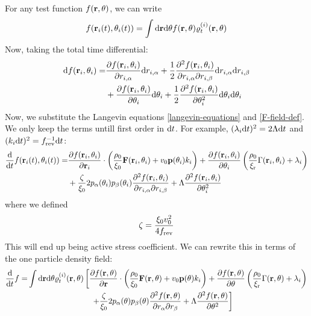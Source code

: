 \documentclass[a5paper]{article}
\begin{document}
For any test function $f(\mathbf{r}, \theta)$, we can write
\begin{align}
    f(\mathbf{r}_i(t), \theta_i(t)) = \int \mathrm{d}\mathbf{r} \mathrm{d}\theta f(\mathbf{r}, \theta) \varrho^{(i)}_t(\mathbf{r}, \theta)
\end{align}
Now, taking the total time differential:
\begin{align}
    \mathrm{d} f(\mathbf{r}_i, \theta_i) 
    =& \frac{\partial f(\mathbf{r}_i, \theta_i)}{\partial r_{i,\alpha}} \mathrm{d} r_{i,\alpha}
    + \frac{1}{2} \frac{\partial^2 f(\mathbf{r}_i, \theta_i)}{\partial r_{i,\alpha}\partial r_{i,\beta}}
    \mathrm{d} r_{i,\alpha}\mathrm{d} r_{i,\beta}
    \\
    &+ \frac{\partial f(\mathbf{r}_i, \theta_i)}{\partial \theta_i} \mathrm{d}\theta_i
    + \frac{1}{2} \frac{\partial^2 f(\mathbf{r}_i, \theta_i)}{\partial \theta_i^2} \mathrm{d}\theta_i\mathrm{d}\theta_i
\end{align}
Now, we substitute the Langevin equations \eqref{langevin-equations} and \cref{F-field-def}. We only keep the terms untill first order in $\mathrm{d} t$. For example, $ (\lambda_i \mathrm{d} t)^2 = 2\Lambda \mathrm{d} t$ and $ (k_i\mathrm{d} t)^2 = f_{\rm rev}^{-1} \mathrm{d} t$:
\begin{align}
    \label{total-time-derivative-f}
    \frac{\mathrm{d}}{\mathrm{d} t} f(\mathbf{r}_i(t), \theta_i(t)) 
    =& \frac{\partial f(\mathbf{r}_i, \theta_i)}{\partial \mathbf{r}_i} \cdot\left( \frac{\rho_0}{\xi_0}\mathbf{F}(\mathbf{r}_i, \theta_i) + v_0 \mathbf{p}(\theta_i) k_i \right) + \frac{\partial f(\mathbf{r}_i, \theta_i)}{\partial \theta_i} \left( \frac{\rho_0}{\xi_{\rm r}}\Gamma(\mathbf{r}_i, \theta_i) + \lambda_i \right) 
    \\
    &+ \frac{\zeta}{\xi_0} 2 p_\alpha(\theta_i) p_\beta(\theta_i) \frac{\partial^2 f(\mathbf{r}_i, \theta_i)}{\partial r_{i,\alpha}\partial r_{i,\beta}} 
    + \Lambda \frac{\partial^2 f(\mathbf{r}_i, \theta_i)}{\partial \theta_i^2}
\end{align}
where we defined
\begin{align}
    \zeta = \frac{\xi_0 v_0^2}{4f_{\rm rev}}
\end{align}
This will end up being active stress coefficient.
We can rewrite this in terms of the one particle density field:
\begin{align}
    \frac{\mathrm{d}}{\mathrm{d} t} f =& \int \mathrm{d}\mathbf{r} \mathrm{d}\theta \varrho^{(i)}_t(\mathbf{r}, \theta) \left[
        \frac{\partial f(\mathbf{r}, \theta)}{\partial \mathbf{r}}\cdot \left(\frac{\rho_0}{\xi_0}\mathbf{F}(\mathbf{r}, \theta) + v_0 \mathbf{p}(\theta) k_i\right) + \frac{\partial f(\mathbf{r}, \theta)}{\partial \theta} \left(\frac{\rho_0}{\xi_{\rm r}}\Gamma(\mathbf{r}, \theta) + \lambda_i\right)
    \right.
    \\
    &\qquad\qquad\qquad\qquad\left.
        + \frac{\zeta}{\xi_0} 2 p_\alpha(\theta) p_\beta(\theta) \frac{\partial^2 f(\mathbf{r}, \theta)}{\partial r_{\alpha}\partial r_{\beta}} 
    + \Lambda \frac{\partial^2 f(\mathbf{r}, \theta)}{\partial \theta^2}
    \right]
\end{align}
\end{document}
